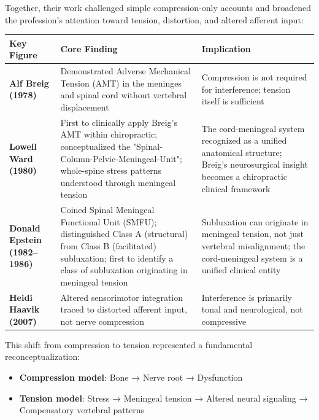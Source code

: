 \documentclass[11pt,letterpaper]{article}
\begin{document}
Together, their work challenged simple compression-only accounts and broadened the profession's attention toward tension, distortion, and altered afferent input:


\begin{center}
\begin{tabular}{lll}
\toprule
\rowcolor{primaryblue}
\textbf{\textsf{\color{white}Key Figure}} & \textbf{\textsf{\color{white}Core Finding}} & \textbf{\textsf{\color{white}Implication}} \\
\midrule
\rowcolor{lightbluebg!40}
\textbf{Alf Breig (1978)} & Demonstrated Adverse Mechanical Tension (AMT) in the meninges and spinal cord without vertebral displacement & Compression is not required for interference; tension itself is sufficient \\
\textbf{Lowell Ward (1980)} & First to clinically apply Breig's AMT within chiropractic; conceptualized the "Spinal-Column-Pelvic-Meningeal-Unit"; whole-spine stress patterns understood through meningeal tension & The cord-meningeal system recognized as a unified anatomical structure; Breig's neurosurgical insight becomes a chiropractic clinical framework \\
\rowcolor{lightbluebg!40}
\textbf{Donald Epstein (1982–1986)} & Coined Spinal Meningeal Functional Unit (SMFU); distinguished Class A (structural) from Class B (facilitated) subluxation; first to identify a class of subluxation originating in meningeal tension & Subluxation can originate in meningeal tension, not just vertebral misalignment; the cord-meningeal system is a unified clinical entity \\
\textbf{Heidi Haavik (2007)} & Altered sensorimotor integration traced to distorted afferent input, not nerve compression & Interference is primarily tonal and neurological, not compressive \\
\bottomrule
\end{tabular}
\end{center}


This shift from compression to tension represented a fundamental reconceptualization:


\begin{itemize}
\item \textbf{Compression model}: Bone → Nerve root → Dysfunction
\item \textbf{Tension model}: Stress → Meningeal tension → Altered neural signaling → Compensatory vertebral patterns
\end{itemize}
\end{document}
